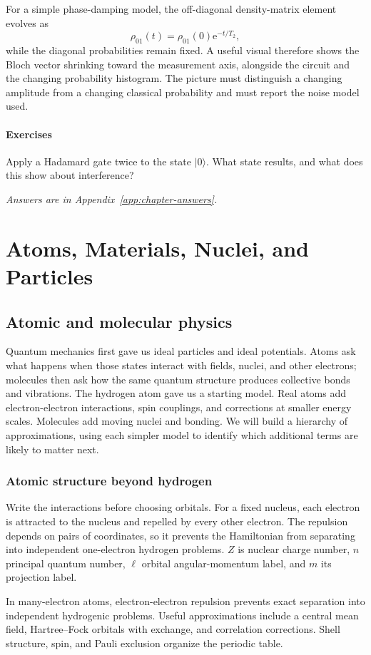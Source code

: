 \documentclass[11pt,oneside]{book}
\newcommand{\ee}{\mathrm{e}}
\newcommand{\ket}[1]{\lvert #1\rangle}
\theoremstyle{reviewstyle}
\newcommand{\learningcheck}[1]{\subsection*{Exercises}\noindent #1\par\smallskip\noindent\emph{Answers are in Appendix~\ref{app:chapter-answers}.}}
\begin{document}
For a simple phase-damping model, the off-diagonal density-matrix element evolves as
\begin{equation}
\rho_{01}(t)=\rho_{01}(0)\ee^{-t/T_2},
\end{equation}
while the diagonal probabilities remain fixed. A useful visual therefore shows the Bloch vector shrinking toward the measurement axis, alongside the circuit and the changing probability histogram. The picture must distinguish a changing amplitude from a changing classical probability and must report the noise model used.

\learningcheck{Apply a Hadamard gate twice to the state $\ket0$. What state results, and what does this show about interference?}

\part{Atoms, Materials, Nuclei, and Particles}
\chapter{Atomic and molecular physics}
Quantum mechanics first gave us ideal particles and ideal potentials. Atoms ask what happens when those states interact with fields, nuclei, and other electrons; molecules then ask how the same quantum structure produces collective bonds and vibrations.
The hydrogen atom gave us a starting model. Real atoms add electron-electron interactions, spin couplings, and corrections at smaller energy scales. Molecules add moving nuclei and bonding. We will build a hierarchy of approximations, using each simpler model to identify which additional terms are likely to matter next.

\section{Atomic structure beyond hydrogen}
Write the interactions before choosing orbitals. For a fixed nucleus, each electron is attracted to the nucleus and repelled by every other electron. The repulsion depends on pairs of coordinates, so it prevents the Hamiltonian from separating into independent one-electron hydrogen problems. $Z$ is nuclear charge number, $n$ principal quantum number, $\ell$ orbital angular-momentum label, and $m$ its projection label.

In many-electron atoms, electron-electron repulsion prevents exact separation into independent hydrogenic problems. Useful approximations include a central mean field, Hartree--Fock orbitals with exchange, and correlation corrections. Shell structure, spin, and Pauli exclusion organize the periodic table.
\end{document}
